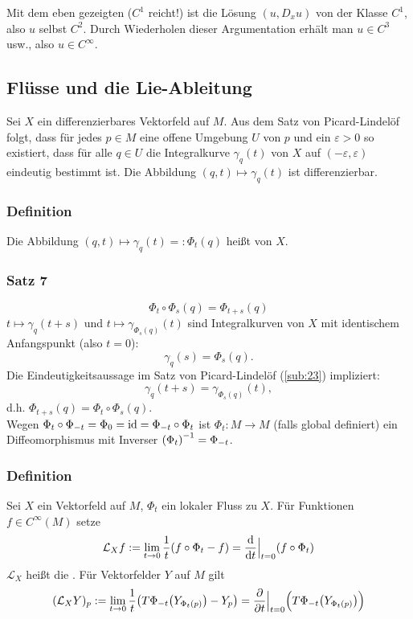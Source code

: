 Mit dem eben gezeigten ($C^1$ reicht!) ist die Lösung $(u, D_x u)$ von der Klasse $C^1$, also $u$ selbst $C^2$. Durch Wiederholen dieser Argumentation erhält man
$u \in C^3$ usw., also $u \in C^\infty$. \bewende
\newpage

\subsection{Flüsse und die Lie-Ableitung} %
\label{sub:24}
Sei $X$ ein differenzierbares Vektorfeld auf $M$. Aus dem Satz von Picard-Lindelöf folgt, dass für jedes $p \in M$ eine offene Umgebung $U$ von $p$ und ein $\varepsilon>0$
so existiert, dass für alle $q \in U$ die Integralkurve $\gamma_q(t)$ von $X$ auf $({-\varepsilon}, \varepsilon)$ eindeutig bestimmt ist. Die Abbildung 
$(q,t) \mapsto \gamma_q(t)$ ist differenzierbar.

\subsubsection[Definition: lokaler Fluss]{Definition} %
\label{ssub:241}
Die Abbildung $(q,t) \mapsto \gamma_q(t) =: \Phi_t(q)$ heißt  von $X$. 

\subsubsection[Satz 7: Verkettung von lokalen Flüssen]{Satz 7} %
\label{ssub:242}
\[
	\Phi_t \circ \Phi_s(q) = \Phi_{t+s}(q)
\]
$t \mapsto \gamma_q(t+s)$ und $t \mapsto \gamma_{\Phi_s(q)}(t)$ sind Integralkurven von $X$ mit identischem Anfangspunkt (also $t=0$): 
\[
	\gamma_q(s) = \Phi_s(q). 
\]
Die Eindeutigkeitsaussage im Satz von Picard-Lindelöf (\ref{sub:23}) impliziert:
\[
	\gamma_q(t +s) = \gamma_{\Phi_s(q)}(t),
\]
d.h. $\Phi_{t+s}(q) = \Phi_t \circ \Phi_s (q)$. \bewende \bigskip\\
Wegen $\Phi_t \circ \Phi_{-t} = \Phi_0 = \id = \Phi_{-t} \circ \Phi_t$ ist $\Phi_t : M \to M$ (falls global definiert) ein Diffeomorphismus mit Inverser
\(
	 \enbrace*{\Phi_t} ^{-1} = \Phi_{-t} 
\).

\subsubsection[Definition: Lie-Ableitung]{Definition} %
\label{ssub:243}
Sei $X$ ein Vektorfeld auf $M$, $\Phi_t$ ein lokaler Fluss zu $X$. Für Funktionen $f \in C^\infty(M)$ setze
\[
	\mathcal{L} _X f := \lim_{ t \to 0} \frac{1}{t} \enbrace*{f \circ  \Phi_t - f} = \diffd{}{t}\Big|_{t=0} (f \circ \Phi_t)    
\]
$\mathcal{L} _X$ heißt die . 
Für Vektorfelder $Y$ auf $M$ gilt
\[
	(\mathcal{L}_X Y)_p := \lim_{ t \to 0} \frac{1}{t} \enbrace*{T \Phi_{-t} \enbrace*{Y_{\Phi_t(p)}} - Y_p} = \diff{}{t}\Big|_{t=0} \enbrace[\Big]{T \Phi_{-t} 
	\enbrace*{Y_{\Phi _t(p)}} }     
\]

